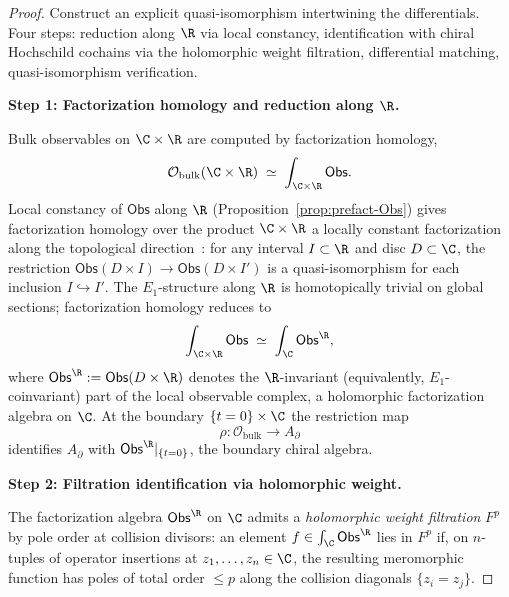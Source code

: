 \begin{proof}
Construct an explicit quasi-isomorphism intertwining the differentials. Four steps: reduction along $\R$ via local constancy, identification with chiral Hochschild cochains via the holomorphic weight filtration, differential matching, quasi-isomorphism verification.

\medskip
\textbf{Step 1: Factorization homology and reduction along $\R$.}

Bulk observables on $\C \times \R$ are computed by factorization homology,
\begin{equation}
\label{eq:bulk-fact-hom}
\mathcal{O}_{\mathrm{bulk}}(\C \times \R) \;\simeq\; \int_{\C \times \R} \mathsf{Obs}.
\end{equation}
Local constancy of $\mathsf{Obs}$ along $\R$ (Proposition~\ref{prop:prefact-Obs}) gives factorization homology over the product $\C \times \R$ a locally constant factorization along the topological direction~\cite{AF15}: for any interval $I \subset \R$ and disc $D \subset \C$, the restriction $\mathsf{Obs}(D \times I) \to \mathsf{Obs}(D \times I')$ is a quasi-isomorphism for each inclusion $I \hookrightarrow I'$. The $E_1$-structure along $\R$ is homotopically trivial on global sections; factorization homology reduces to
\begin{equation}
\label{eq:R-reduction}
\int_{\C \times \R} \mathsf{Obs} \;\simeq\; \int_{\C} \mathsf{Obs}^{\R},
\end{equation}
where $\mathsf{Obs}^{\R} := \mathsf{Obs}(D \times \R)$ denotes the $\R$-invariant (equivalently, $E_1$-coinvariant) part of the local observable complex, a holomorphic factorization algebra on $\C$. At the boundary $\{t = 0\} \times \C$ the restriction map
\begin{equation}
\rho : \mathcal{O}_{\mathrm{bulk}} \longrightarrow A_{\partial}
\end{equation}
identifies $A_{\partial}$ with $\mathsf{Obs}^{\R}|_{\{t=0\}}$, the boundary chiral algebra.

\medskip
\textbf{Step 2: Filtration identification via holomorphic weight.}

The factorization algebra $\mathsf{Obs}^{\R}$ on $\C$ admits a \emph{holomorphic weight filtration} $F^p$ by pole order at collision divisors: an element $f \in \int_{\C} \mathsf{Obs}^{\R}$ lies in $F^p$ if, on $n$-tuples of operator insertions at $z_1, \ldots, z_n \in \C$, the resulting meromorphic function has poles of total order $\le p$ along the collision diagonals $\{z_i = z_j\}$.


\end{proof}
